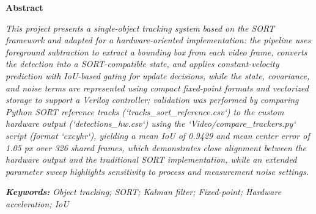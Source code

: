 \thispagestyle{plain}
\begin{center}
{\fontsize{14}{16}\selectfont \textbf{Abstract}}

\vspace{1cm}

\justifying
\emph{This project presents a single-object tracking system based on the SORT framework and adapted for a hardware-oriented implementation: the pipeline uses foreground subtraction to extract a bounding box from each video frame, converts the detection into a SORT-compatible state, and applies constant-velocity prediction with IoU-based gating for update decisions, while the state, covariance, and noise terms are represented using compact fixed-point formats and vectorized storage to support a Verilog controller; validation was performed by comparing Python SORT reference tracks (`tracks_sort_reference.csv`) to the custom hardware output (`detections_hw.csv`) using the `Video/compare_trackers.py` script (format `cxcyhr`), yielding a mean IoU of 0.9429 and mean center error of 1.05 px over 326 shared frames, which demonstrates close alignment between the hardware output and the traditional SORT implementation, while an extended parameter sweep highlights sensitivity to process and measurement noise settings.}

\vspace{0.75em}

\noindent \emph{\textbf{Keywords:} Object tracking; SORT; Kalman filter; Fixed-point; 
Hardware acceleration; IoU}

\end{center}
